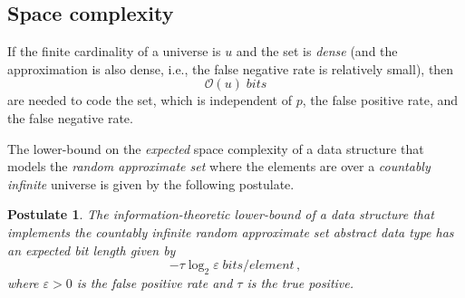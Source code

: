 \documentclass[10pt,final,hidelinks]{article}
\numberwithin{equation}{section}
\newcommand{\p}{p}
\newcommand{\tprate}{\tau}
\newcommand{\fprate}{\varepsilon}
\newcommand{\envnumstyle}{chapter}
\renewcommand{\envnumstyle}{chapter}
\renewcommand{\envnumstyle}{section}
\theoremstyle{plain}
\newtheorem{postulate}{Postulate}[\envnumstyle]
\begin{document}
\subsection{Space complexity}
\label{sec:space_comp}
If the finite cardinality of a universe is $u$ and the set is \emph{dense} (and the approximation is also dense, i.e., the false negative rate is relatively 
small), then
\begin{equation}
    \mathcal{O}(u) \; \si{bits}
\end{equation}
are needed to code the set, which is independent of $\p$, the false positive rate, and the false negative rate.

The lower-bound on the \emph{expected} space complexity of a data structure that models the \emph{random approximate set} where the elements are over a \emph{countably infinite} universe is given by the following postulate.
\begin{postulate}
\label{pst:approx_l_b}
The \emph{information-theoretic lower-bound} of a data structure that implements the countably infinite \emph{random approximate set} abstract data type has an \emph{expected} bit length given by
\begin{equation}
    -\tprate \log_2 \fprate \; \si{bits \per element}\,,
\end{equation}
where $\fprate > 0$ is the false positive rate and $\tprate$ is the true positive.
\end{postulate}
\end{document}
